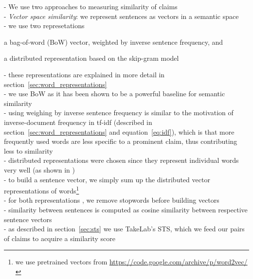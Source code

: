 - We use two approaches to measuring similarity of claims \\
- \textit{Vector space similarity}: we represent sentences as vectors in a semantic space  \\
- we use two represetations \begin{enumerate*} \item a bag-of-word (BoW) vector, weighted
by inverse sentence frequency, and \item a distributed representation based on the
skip-gram model \citep{mikolov2013distributed} \\
\end{enumerate*}
- these representations are explained in more detail in 
section~\ref{sec:word_representations} \\
- we use BoW as it has been shown to be a powerful baseline for semantic similarity 
\citep{ramage2009random} \\
- using weighing by inverse sentence frequency is similar to the motivation 
of inverse-document frequency in tf-idf (described in section~\ref{sec:word_representations} and
equation~\ref{eq:idf}), which is that more frequently used words are less
specific to a prominent claim, thus contributing less to similarity  \\
- distributed representations were chosen since they represent individual words 
very well (as shown in \citep{mikolov2013efficient, mikolov2013distributed}) \\
- to build a sentence vector, we simply sum up the distributed vector representations 
of words\footnote{we use pretrained vectors from \url{https://code.google.com/archive/p/word2vec/}} \\
- for both representations , we remove stopwords before building vectors \\
- similarity between sentences is computed as cosine similarity between 
respective sentence vectors \\
- as described in section~\ref{sec:sts} we use TakeLab's STS, which we feed our pairs
of claims to acquire a similarity score \\

